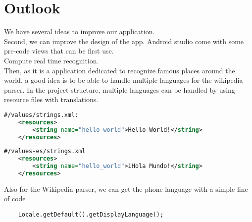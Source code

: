 \section{Outlook}
We have several ideas to improve our application.\\

Second, we can improve the design of the app. Android studio come with some pre-code views that can be first use.\\

Compute real time recognition.\\

Then, as it is a application dedicated to recognize famous places around the world, a good idea is to be able to handle multiple languages for the wikipedia parser. In the project structure, multiple languages can be handled by using resource files with translations.
\begin{lstlisting}[language=XML, basicstyle=\scriptsize]
    #/values/strings.xml:
    <resources>
        <string name="hello_world">Hello World!</string>
    </resources>
\end{lstlisting}

\begin{lstlisting}[language=XML, basicstyle=\scriptsize]
    #/values-es/strings.xml
    <resources>
        <string name="hello_world">iHola Mundo!</string>
    </resources>
\end{lstlisting}

Also for the Wikipedia parser, we can get the phone language with a simple line of code
\begin{lstlisting}
    Locale.getDefault().getDisplayLanguage();
\end{lstlisting}